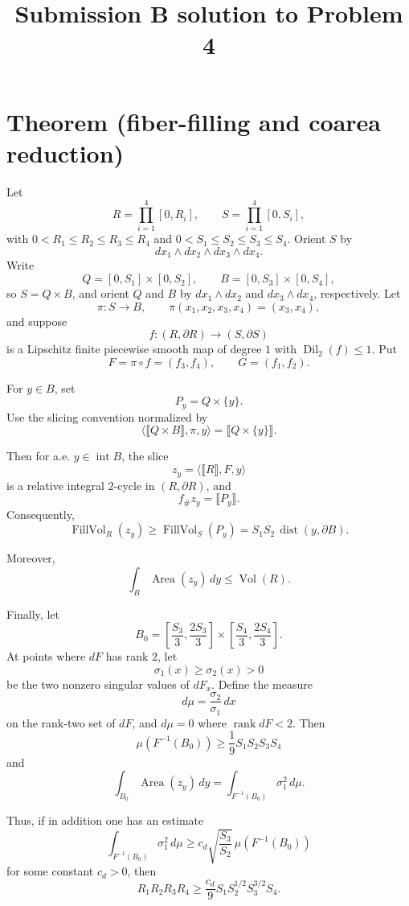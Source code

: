 \documentclass[12pt]{article}
\begin{document}
\title{Submission B solution to Problem 4}
\date{}
\maketitle

\section*{Theorem (fiber-filling and coarea reduction)}

Let
\[
R=\prod_{i=1}^4[0,R_i],\qquad S=\prod_{i=1}^4[0,S_i],
\]
with \(0<R_1\le R_2\le R_3\le R_4\) and \(0<S_1\le S_2\le S_3\le S_4\). Orient \(S\) by
\[
dx_1\wedge dx_2\wedge dx_3\wedge dx_4.
\]
Write
\[
Q=[0,S_1]\times[0,S_2],\qquad B=[0,S_3]\times[0,S_4],
\]
so \(S=Q\times B\), and orient \(Q\) and \(B\) by \(dx_1\wedge dx_2\) and \(dx_3\wedge dx_4\), respectively. Let
\[
\pi:S\to B,\qquad \pi(x_1,x_2,x_3,x_4)=(x_3,x_4),
\]
and suppose
\[
f:(R,\partial R)\to(S,\partial S)
\]
is a Lipschitz finite piecewise smooth map of degree \(1\) with \(\operatorname{Dil}_2(f)\le 1\). Put
\[
F=\pi\circ f=(f_3,f_4),\qquad G=(f_1,f_2).
\]

For \(y\in B\), set
\[
P_y=Q\times\{y\}.
\]
Use the slicing convention normalized by
\[
\langle \llbracket Q\times B\rrbracket,\pi,y\rangle
=
\llbracket Q\times\{y\}\rrbracket .
\]

Then for a.e. \(y\in \operatorname{int}B\), the slice
\[
z_y=\langle \llbracket R\rrbracket,F,y\rangle
\]
is a relative integral \(2\)-cycle in \((R,\partial R)\), and
\[
f_\# z_y=\llbracket P_y\rrbracket .
\]
Consequently,
\[
\operatorname{FillVol}_R(z_y)\ge \operatorname{FillVol}_S(P_y)
=S_1S_2\,\operatorname{dist}(y,\partial B).
\]

Moreover,
\[
\int_B \operatorname{Area}(z_y)\,dy\le \operatorname{Vol}(R).
\]

Finally, let
\[
B_0=\left[\frac{S_3}{3},\frac{2S_3}{3}\right]\times
\left[\frac{S_4}{3},\frac{2S_4}{3}\right].
\]
At points where \(dF\) has rank \(2\), let
\[
\sigma_1(x)\ge \sigma_2(x)>0
\]
be the two nonzero singular values of \(dF_x\). Define the measure
\[
d\mu=\frac{\sigma_2}{\sigma_1}\,dx
\]
on the rank-two set of \(dF\), and \(d\mu=0\) where \(\operatorname{rank}dF<2\). Then
\[
\mu(F^{-1}(B_0))\ge \frac19 S_1S_2S_3S_4
\]
and
\[
\int_{B_0}\operatorname{Area}(z_y)\,dy
=
\int_{F^{-1}(B_0)}\sigma_1^2\,d\mu.
\]

Thus, if in addition one has an estimate
\[
\int_{F^{-1}(B_0)}\sigma_1^2\,d\mu
\ge
c_d\sqrt{\frac{S_3}{S_2}}\,
\mu(F^{-1}(B_0))
\]
for some constant \(c_d>0\), then
\[
R_1R_2R_3R_4
\ge
\frac{c_d}{9}S_1S_2^{1/2}S_3^{3/2}S_4.
\]
\end{document}
